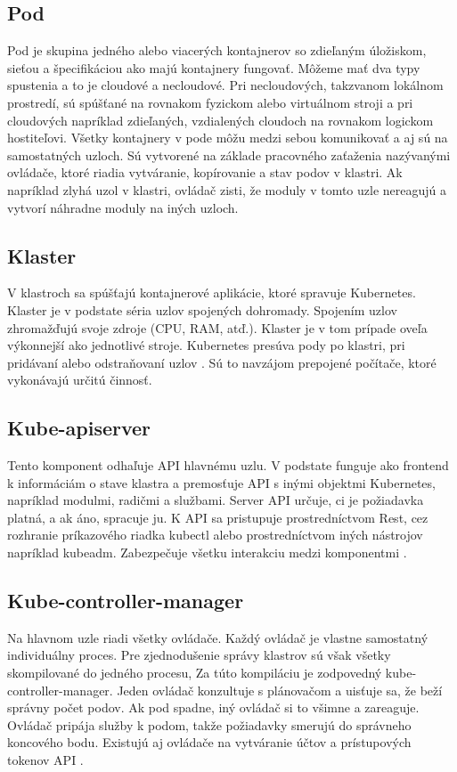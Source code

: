 \subsection*{Pod}
Pod je skupina jedného alebo viacerých kontajnerov so zdieľaným úložiskom, sieťou a špecifikáciou ako majú kontajnery fungovať. Môžeme mať dva typy spustenia a to je cloudové a necloudové. Pri necloudových, takzvanom lokálnom prostredí, sú spúšťané na rovnakom fyzickom alebo virtuálnom stroji a pri cloudových napríklad zdieľaných, vzdialených cloudoch na rovnakom logickom hostiteľovi. Všetky kontajnery v pode môžu medzi sebou komunikovať a aj sú na samostatných uzloch. Sú vytvorené na základe pracovného zaťaženia nazývanými ovládače, ktoré riadia vytváranie, kopírovanie a stav podov v klastri. Ak napríklad zlyhá uzol v klastri, ovládač zisti, že moduly v tomto uzle nereagujú a vytvorí náhradne moduly na iných uzloch.

\subsection*{Klaster}
V klastroch sa spúšťajú kontajnerové aplikácie, ktoré spravuje Kubernetes. Klaster je v podstate séria uzlov spojených dohromady. Spojením uzlov zhromažďujú svoje zdroje (CPU, RAM, atď.). Klaster je v tom prípade oveľa výkonnejší ako jednotlivé stroje. Kubernetes presúva pody po klastri, pri pridávaní alebo odstraňovaní uzlov \cite{kubernetes2}. Sú to navzájom prepojené počítače, ktoré vykonávajú určitú činnosť.

\subsection*{Kube-apiserver}
Tento komponent odhaľuje API hlavnému uzlu. V podstate funguje ako frontend k informáciám o stave klastra a premosťuje API s inými objektmi Kubernetes, napríklad modulmi, radičmi a službami. Server API určuje, ci je požiadavka platná, a ak áno, spracuje ju. K API sa pristupuje prostredníctvom Rest, cez rozhranie príkazového riadka kubectl alebo prostredníctvom iných nástrojov napríklad kubeadm. Zabezpečuje všetku interakciu medzi komponentmi \cite{kubeapiserver}.

\subsection*{Kube-controller-manager}
Na hlavnom uzle riadi všetky ovládače. Každý ovládač je vlastne samostatný individuálny proces. Pre zjednodušenie správy klastrov sú však všetky skompilované do jedného procesu, Za túto kompiláciu je zodpovedný kube-controller-manager. Jeden ovládač konzultuje s plánovačom a uisťuje sa, že beží správny počet podov. Ak pod spadne, iný ovládač si to všimne a zareaguje. Ovládač pripája služby k podom, takže požiadavky smerujú do správneho koncového bodu. Existujú aj ovládače na vytváranie účtov a prístupových tokenov API \cite{kubecontroler}.

